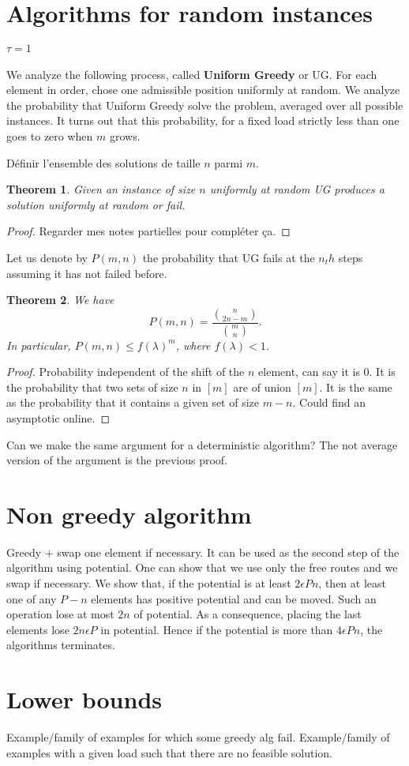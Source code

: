 \documentclass[10pt, conference, letterpaper]{IEEEtran}
\newtheorem{theorem}{Theorem}
\begin{document}
\section{Algorithms for random instances}

\paragraph{$\tau = 1$}

We analyze the following process, called \textbf{Uniform Greedy} or UG.
For each element in order, chose one admissible position
uniformly at random. We analyze the probability that Uniform Greedy
solve the problem, averaged over all possible instances. 
It turns out that this probability, for a fixed load strictly less than one goes to zero when $m$ grows. 

Définir l'ensemble des solutions de taille $n$ parmi $m$.
\begin{theorem}
Given an instance of size $n$ uniformly at random UG
produces a solution uniformly at random or fail.
\end{theorem}
\begin{proof}
Regarder mes notes partielles pour compléter ça.
\end{proof}

Let us denote by $P(m,n)$ the probability that UG fails at the $n_th$
steps assuming it has not failed before.

\begin{theorem}
We have $$P(m,n) = \frac{\binom{n}{2n-m}}{\binom{m}{n}}.$$
In particular, $P(m,n) \leq f(\lambda)^m$, where $f(\lambda) < 1$.
\end{theorem}
\begin{proof}
Probability independent of the shift of the $n$ element, can say it is $0$.
It is the probability that two sets of size $n$ in $[m]$ are of union $[m]$.
It is the same as the probability that it contains a given set of size $m-n$.
Could find an asymptotic online.
\end{proof}

Can we make the same argument for a deterministic algorithm?
The not average version of the argument is the previous proof.


\section{Non greedy algorithm}

Greedy + swap one element if necessary. It can be used as the second step of the algorithm using potential. One can show that we use only the free routes and we swap if necessary. We show that, if the potential is at least $2\epsilon P n$, then at least one of any 
$P-n$ elements has positive potential and can be moved. Such an operation lose at most $2n$ of potential. As a consequence, placing the last elements lose $2n\epsilon P$ in potential. Hence if the potential is more than $4\epsilon P n$, the algorithms terminates.



\section{Lower bounds}

Example/family of examples for which some greedy alg fail.
Example/family of examples with a given load such that there are no feasible solution.


 
\end{document}
